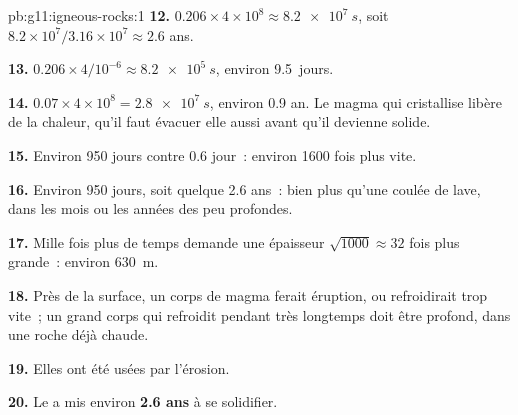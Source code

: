 \begin{solution}{pb:g11:igneous-rocks:1}
\textbf{12.} $0.206 \times 4 \times 10^8 \approx \qty{8.2e7}{s}$, soit
$8.2 \times 10^7 / 3.16 \times 10^7 \approx 2.6$ ans.

\textbf{13.} $0.206 \times 4/10^{-6} \approx \qty{8.2e5}{s}$, environ
9.5~jours.

\textbf{14.} $0.07 \times 4 \times 10^8 = \qty{2.8e7}{s}$, environ 0.9 an.
Le magma qui cristallise libère de la chaleur, qu'il faut évacuer elle
aussi avant qu'il devienne solide.

\textbf{15.} Environ 950 jours contre 0.6 jour~: environ 1600 fois plus
vite.

\textbf{16.} Environ 950 jours, soit quelque 2.6 ans~: bien plus qu'une coulée
de lave, dans les mois ou les années des  peu profondes.

\textbf{17.} Mille fois plus de temps demande une épaisseur $\sqrt{1000} \approx
32$ fois plus grande~: environ \qty{630}{m}.

\textbf{18.} Près de la surface, un corps de magma ferait éruption, ou
refroidirait trop vite~; un grand corps qui refroidit pendant très
longtemps doit être profond, dans une roche déjà chaude.

\textbf{19.} Elles ont été usées par l'érosion.

\textbf{20.} Le  a mis environ \textbf{2.6 ans} à se solidifier.
\end{solution}
